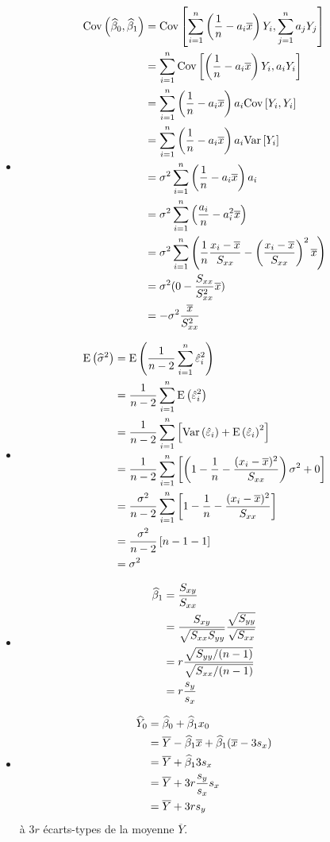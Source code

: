 \documentclass[letter, 11pt]{article}
\begin{document}
\begin{itemize}
    \item[(a)] 
        \begin{align*}
            \mathrm{Cov} \left( \widehat{\beta}_0, \widehat{\beta}_1 \right)
            &= \mathrm{Cov} \left[ \sum_{i=1}^n\left( \frac{1}{n} - a_i \overline{x}\right)Y_i ,  \sum_{j=1}^n a_j Y_j \right] \cr
            &= \sum_{i=1}^n \mathrm{Cov} \left[ \left( \frac{1}{n} - a_i \overline{x}\right)Y_i , a_i Y_i \right] \cr
            &= \sum_{i=1}^n \left( \frac{1}{n} - a_i \overline{x}\right) a_i \mathrm{Cov} \left[ Y_i , Y_i \right] \cr
            &= \sum_{i=1}^n \left( \frac{1}{n} - a_i \overline{x}\right) a_i \mathrm{Var} \left[ Y_i \right] \cr
            &= \sigma^2 \sum_{i=1}^n \left( \frac{1}{n} - a_i \overline{x}\right) a_i  \cr
            &=  \sigma^2 \sum_{i=1}^n \left( \frac{a_i}{n} - a_i^2 \overline{x}\right)   \cr
            &=  \sigma^2 \sum_{i=1}^n \left( \frac{1}{n} \frac{x_i-\overline{x}}{S_{xx}} - \left( \frac{x_i-\overline{x}}{S_{xx}}\right)^2 \overline{x}\right)   \cr
            &= \sigma^2 (0 - \frac{S_{xx}}{S_{xx}^2}  \overline{x}) \cr
             &= - \sigma^2 \frac{\overline{x}}{S_{xx}^2}  
        \end{align*}
    \item[(b)] 
        \begin{align*}
            \mathrm{E}\left(\widehat{\sigma}^2\right)
            &=\mathrm{E}\left(\frac{1}{n-2} \sum\limits_{i=1}^n \hat\varepsilon_i^2\right) \cr
            &= \frac{1}{n-2} \sum\limits_{i=1}^n \mathrm{E}\left(\hat\varepsilon_i^2\right) \cr
             &= \frac{1}{n-2} \sum\limits_{i=1}^n \left[ \mathrm{Var}\left(\hat\varepsilon_i\right) + \mathrm{E}\left(\hat\varepsilon_i\right)^2 \right]\cr
             &= \frac{1}{n-2} \sum\limits_{i=1}^n \left[ \left(1- \frac{1}{n} - \frac{(x_i - \overline{x})^2}{S_{xx}}\right)\sigma^2+ 0\right]\cr
             &= \frac{\sigma^2}{n-2} \sum\limits_{i=1}^n \left[ 1- \frac{1}{n} - \frac{(x_i - \overline{x})^2}{S_{xx}}\right]\cr
             &= \frac{\sigma^2}{n-2}  \left[ n- 1 - 1\right]\cr
             &= \sigma^2
        \end{align*}
    \item[(c)] 
        \begin{align*}
            \widehat{\beta}_1
            &= \frac{S_{xy}}{S_{xx}} \cr
            &= \frac{S_{xy}}{\sqrt{S_{xx}S_{yy}}} \frac{\sqrt{S_{yy}}}{\sqrt{S_{xx}}} \cr
             &= r \frac{\sqrt{S_{yy}/(n-1)}}{\sqrt{S_{xx}/(n-1)}} \cr
             &= r \frac{s_y}{s_x}
        \end{align*}
    \item[(d)] 
        \begin{align*}
            \widehat{Y}_0 
            &= \widehat{\beta}_0 + \widehat{\beta}_1 x_0 \cr
            &= \overline{Y} - \widehat{\beta}_1\overline{x} + \widehat{\beta}_1 (\overline{x} - 3s_x)\cr
            &=  \overline{Y}  + \widehat{\beta}_1 3s_x \cr
            &= \overline{Y}  + 3 r \frac{s_y}{s_x} s_x \cr
            &=  \overline{Y}  + 3 r s_y
        \end{align*}
        à $3r$ écarts-types de la moyenne $\overline{Y}$.
\end{itemize}
\end{document}
